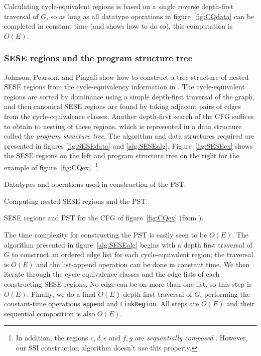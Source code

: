 \documentclass[12pt,titlepage,twoside]{article}
\newcommand*{\figscale}{1.0}
\begin{document}
Calculating cycle-equivalent regions is based on a single reverse
depth-first traversal of $G$, so as long as all datatype operations in
figure~\ref{fig:CQdata} can be completed in constant time (and
\cite{johnson93:sese} shows how to do so), this computation is $O(E)$.

\subsubsection{SESE regions and the program structure tree}
Johnson, Pearson, and Pingali show how to construct a tree structure
of nested SESE regions from the cycle-equivalency information in
\cite{johnson94:pst}.  The cycle-equivalent regions are sorted by
dominance using a simple depth-first traversal of the graph, and then
canonical SESE regions are found by taking adjacent pairs of
edges from the cycle-equivalence classes.  Another depth-first search
of the CFG suffices to obtain to nesting of these regions,
which is represented in a data structure called the 
\emph{program structure tree}.
The algorithm and data structures required are presented in figures
\ref{fig:SESEdata} and \ref{alg:SESEalg}.  Figure~\vref{fig:SESEex}
shows the SESE regions on the left and program structure tree on
the right for the example of figure~\vref{fig:CQex}.%
\footnote{In addition, the regions ${c,d,e}$ and ${f,g}$ are
\emph{sequentially composed} \cite{johnson94:pst}. 
However, our SSI construction algorithm doesn't use this property.}

\begin{myfigure}\small
\caption{Datatypes and operations used in construction of the PST.}
\label{fig:SESEdata}\end{myfigure}

\begin{myalgorithm}\small
\caption{Computing nested SESE regions and the PST.}
\label{alg:SESEalg}\end{myalgorithm}

\begin{myfigure}\centering
\vertcenter{\renewcommand*{\figscale}{0.5}}\hspace{1cm}
\vertcenter{\renewcommand*{\figscale}{0.7}}
\caption{SESE regions and PST for the CFG of
         figure~\ref{fig:CQex} (from \cite{johnson94:pst}).}
\label{fig:SESEex}\end{myfigure}

The time complexity for constructing the PST is easily seen to be
$O(E)$. The algorithm presented in figure~\vref{alg:SESEalg} begins
with a depth first traversal of $G$ to construct an ordered edge list
for each cycle-equivalent region; the traversal is $O(E)$ and the
list-append operation can be done in constant time.  We then iterate
through the cycle-equivalence classes and the edge lists of each
constructing SESE regions.  No edge can be on more than one list, so
this step is $O(E)$.  Finally, we do a final $O(E)$ depth-first
traversal of $G$, performing the constant-time operations {\tt append}
and {\tt LinkRegion}.  All steps are $O(E)$ and their sequential
composition is also $O(E)$.
\end{document}
